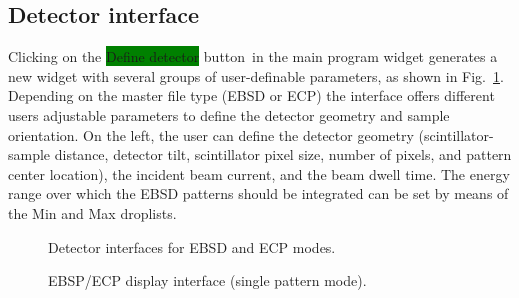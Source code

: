 \documentclass[DIV=calc, paper=letter, fontsize=11pt]{scrartcl}	 %
\newcommand{\button}[1]{\colorbox{green}{\textsf{#1}} button}
\begin{document}
\subsection{Detector interface\label{sec:idldetector}}
Clicking on the \button{Define detector}\ in the main program widget generates a new widget with several groups of user-definable parameters, as
shown in Fig.~\ref{fig:detector}.  Depending on the master file type (EBSD or ECP) the interface offers different users adjustable parameters
to define the detector geometry and sample orientation.
On the left, the user can define the detector geometry (scintillator-sample distance, detector tilt, scintillator pixel size, number of pixels, and pattern
center location), the incident beam current, and the beam dwell time. The energy range 
over which the EBSD patterns should be integrated can be set by means of the Min and Max droplists.  

\begin{figure}[t]
\leavevmode\centering
\epsfxsize=6in
\caption{\label{fig:detector}Detector interfaces for EBSD and ECP modes.}
\end{figure}

\begin{figure}[t]
\leavevmode\centering
\epsfxsize=5in
\caption{\label{fig:EBSP}EBSP/ECP display interface (single pattern mode).}
\end{figure}
\end{document}

